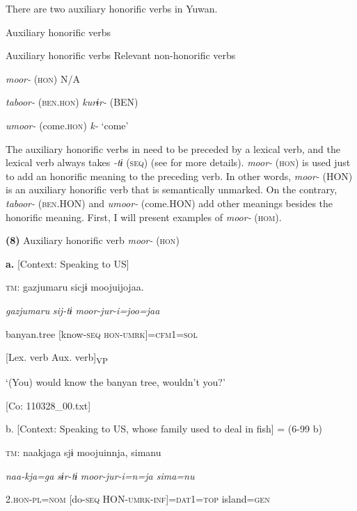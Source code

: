 There are two auxiliary honorific verbs in Yuwan.

\begin{styleBeschriftung}
\textmd{}\textmd{ Auxiliary honorific verbs}
\end{styleBeschriftung}

Auxiliary honorific verbs  Relevant non-honorific verbs

\textit{moor-} (\textsc{hon})  N/A

\textit{taboor-} (\textsc{ben}.\textsc{hon})  \textit{kurɨr-} (BEN)

\textit{umoor-} (come.\textsc{hon})  \textit{k-} ‘come’

The auxiliary honorific verbs in  need to be preceded by a lexical verb, and the lexical verb always takes \textit{{}-tɨ} (\textsc{seq}) (see  for more details). \textit{moor-} (\textsc{hon}) is used just to add an honorific meaning to the preceding verb. In other words, \textit{moor-} (HON) is an auxiliary honorific verb that is semantically unmarked. On the contrary, \textit{taboor-} (\textsc{ben}.HON) and \textit{umoor-} (come.HON) add other meanings besides the honorific meaning. First, I will present examples of \textit{moor-} (\textsc{hom}).

\textbf{(8)}  Auxiliary honorific verb \textit{moor-} (\textsc{hon})

  \textbf{a.}  [Context: Speaking to US]

    \textsc{tm}:  gazjumaru  sicjɨ  moojuijojaa.

      \textit{gazjumaru}  \textit{sij-tɨ}  \textit{moor{}-jur-i=joo=jaa}

      banyan.tree  [know-\textsc{seq}  \textsc{hon}-\textsc{umrk}]=\textsc{cfm}1=\textsc{sol}

        [Lex. verb  Aux. verb]\textsubscript{VP}

      ‘(You) would know the banyan tree, wouldn’t you?’

      [Co: 110328\_00.txt]

  b.  [Context: Speaking to US, whose family used to deal in fish] = (6-99 b)

    \textsc{tm}:  naakjaga  sjɨ  moojuinnja,  simanu

      \textit{naa-kja=ga}  \textit{sɨr-tɨ}  \textit{moor{}-jur-i=n=ja  sima=nu}

      2.\textsc{hon}-\textsc{pl}=\textsc{nom}  [do-\textsc{seq}  HON-\textsc{umrk}-\textsc{inf}]=\textsc{dat}1=\textsc{top}  island=\textsc{gen}

